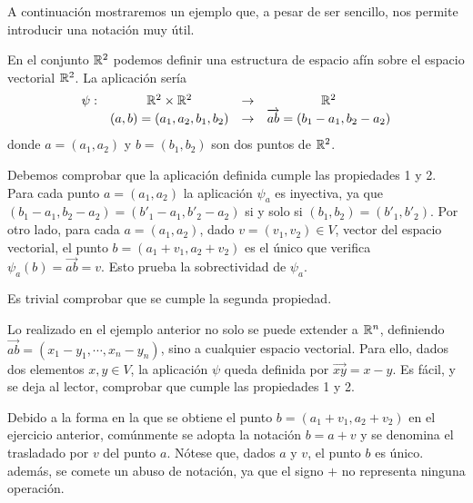 A continuación mostraremos un ejemplo que, a pesar de ser sencillo, nos permite introducir una notación muy útil.
\begin{exa}
	En el conjunto $\mathbb{R}^2$ podemos definir una estructura de espacio afín sobre el espacio vectorial $\mathbb{R}^2$. La aplicación sería 
	\begin{equation*}
		\begin{array}{cccc}
		\psi: & \mathbb{R}^2 \times \mathbb{R}^2 & \rightarrow &\mathbb{R}^2\\
		& (a,b)=(a_1,a_2,b_1,b_2) & \rightarrow & \overrightarrow{ab}=(b_1-a_1,b_2-a_2)
		\end{array}
	\end{equation*}
	donde $a=(a_1,a_2)$ y $b=(b_1,b_2)$ son dos puntos de $\mathbb{R}^2$.
	
	Debemos comprobar que la aplicación definida cumple las propiedades 1 y 2. Para cada punto $a=(a_1,a_2)$ la aplicación $\psi_a$ es inyectiva, ya que $(b_1-a_1,b_2-a_2)=(b'_1-a_1,b'_2-a_2)$ si y solo si $(b_1,b_2)=(b'_1,b'_2)$. Por otro lado, para cada $a=(a_1,a_2)$, dado $v=(v_1,v_2)\in V$, vector del espacio vectorial, el punto $b=(a_1+v_1,a_2+v_2)$ es el único que verifica $\psi_a(b)=\overrightarrow{ab}=v$. Esto prueba la sobrectividad de $\psi_a$.
	
	Es trivial comprobar que se cumple la segunda propiedad.
\end{exa} 
\begin{obs}
	Lo realizado en el ejemplo anterior no solo se puede extender a $\mathbb{R}^n$, definiendo $\overrightarrow{ab}=(x_1-y_1,\cdots,x_n-y_n)$, sino a cualquier espacio vectorial. Para ello, dados dos elementos $x,y\in V$, la aplicación $\psi$ queda definida por $\overrightarrow{xy}=x-y$. Es fácil, y se deja al lector, comprobar que cumple las propiedades 1 y 2.
\end{obs}
\begin{obs}[Notación]\label{c9_obs_notacion}
	Debido a la forma en la que se obtiene el punto $b=(a_1+v_1,a_2+v_2)$ en el ejercicio anterior, comúnmente se adopta la notación $b=a+v$ y se denomina el trasladado por $v$ del punto $a$. Nótese que, dados $a$ y $v$, el punto $b$ es único. además, se comete un abuso de notación, ya que el signo $+$ no representa ninguna operación.
\end{obs}

